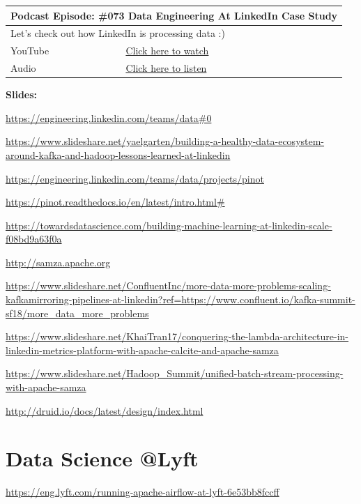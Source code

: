 \documentclass[12pt, numbers=noenddot]{scrreprt} %
\begin{document}
\begin{table}[h]
\begin{tabular}{ll}
\hline
\multicolumn{2}{l}{\textbf{Podcast Episode:} \#073 Data Engineering At LinkedIn Case Study} \\ \hline
\multicolumn{2}{p{15cm}}{Let's check out how LinkedIn is processing data :)}         \\ \hline
\multicolumn{1}{l|}{YouTube}   & \href{https://youtu.be/wgfoE8Jbr_Q}{Click here to watch}   \\ 
\multicolumn{1}{l|}{Audio}     & \href{https://anchor.fm/andreaskayy/episodes/073-Data-Engineering-At-LinkedIn-Case-Study-e45is6}{Click here to listen}   \\ \hline
\end{tabular}
\end{table}

\textbf{Slides:}

\url{https://engineering.linkedin.com/teams/data#0}

\url{https://www.slideshare.net/yaelgarten/building-a-healthy-data-ecosystem-around-kafka-and-hadoop-lessons-learned-at-linkedin}

\url{https://engineering.linkedin.com/teams/data/projects/pinot}

\url{https://pinot.readthedocs.io/en/latest/intro.html#}

\url{https://towardsdatascience.com/building-machine-learning-at-linkedin-scale-f08bd9a63f0a}

\url{http://samza.apache.org}

\url{https://www.slideshare.net/ConfluentInc/more-data-more-problems-scaling-kafkamirroring-pipelines-at-linkedin?ref=https://www.confluent.io/kafka-summit-sf18/more_data_more_problems}

\url{https://www.slideshare.net/KhaiTran17/conquering-the-lambda-architecture-in-linkedin-metrics-platform-with-apache-calcite-and-apache-samza}

\url{https://www.slideshare.net/Hadoop_Summit/unified-batch-stream-processing-with-apache-samza}

\url{http://druid.io/docs/latest/design/index.html}

\section{Data Science @Lyft}
\url{https://eng.lyft.com/running-apache-airflow-at-lyft-6e53bb8fccff}
\end{document}
